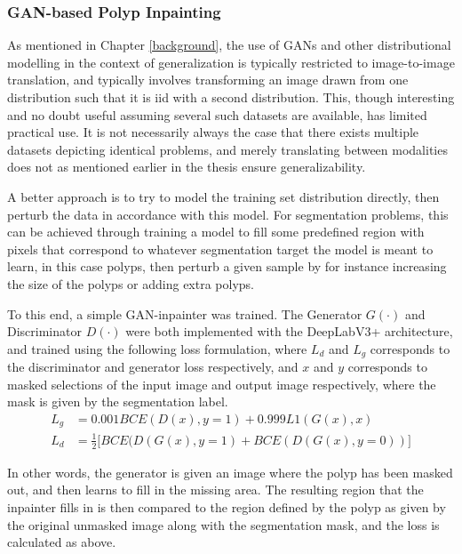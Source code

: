 \subsubsection{GAN-based Polyp Inpainting}
As mentioned in Chapter \ref{background}, the use of GANs and other distributional modelling in the context of generalization is typically restricted to image-to-image translation, and typically involves transforming an image drawn from one distribution such that it is \gls{iid} with a second distribution. This, though interesting and no doubt useful assuming several such datasets are available, has limited practical use. It is not necessarily always the case that there exists multiple datasets depicting identical problems, and merely translating between modalities does not as mentioned earlier in the thesis ensure generalizability.

A better approach is to try to model the training set distribution directly, then perturb the data in accordance with this model. For segmentation problems, this can be achieved through training a model to fill some predefined region with pixels that correspond to whatever segmentation target the model is meant to learn, in this case polyps, then perturb a given sample by for instance increasing the size of the polyps or adding extra polyps.

To this end, a simple GAN-inpainter was trained. The Generator \(G(\cdot)\) and Discriminator \(D(\cdot)\) were both implemented with the DeepLabV3+ architecture, and trained using the following loss formulation, where \(L_d\) and \(L_g\) corresponds to the discriminator and generator loss respectively, and \(x\) and \(y\) corresponds to masked selections of the input image and output image respectively, where the mask is given by the segmentation label. 
\begin{align}
    L_g &= 0.001 BCE(D(x),y=1) + 0.999 L1(G(x), x) \\
    L_d &= \frac{1}{2}\big[ BCE(D(G(x),y=1)+BCE(D(G(x), y=0)) \big]
\end{align}

In other words, the generator is given an image where the polyp has been masked out, and then learns to fill in the missing area. The resulting region that the inpainter fills in is then compared to the region defined by the polyp as given by the original unmasked image along with the segmentation mask, and the loss is calculated as above.

